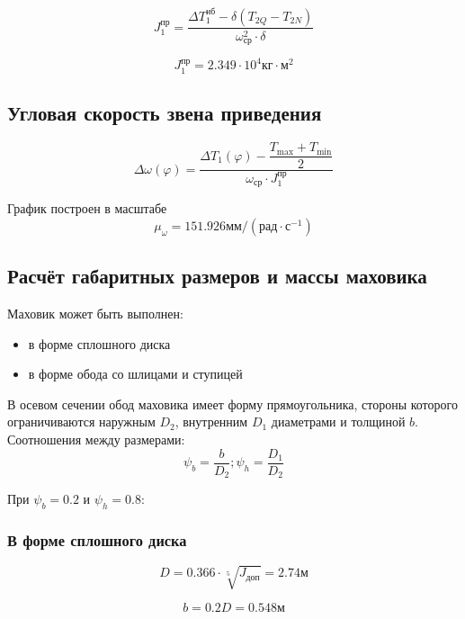 \begin{equation}
	J_1^{пр} = \dfrac{\Delta T_1^{нб} - \delta(T_{2Q} - T_{2N})}{\omega_{ср}^2 \cdot \delta}
\end{equation}

\begin{equation*}
	J_1^{пр} = 2.349 \cdot 10^4 кг \cdot м^2
\end{equation*}

\subsection{Угловая скорость звена приведения}

\begin{equation}
	\Delta \omega(\varphi) = \dfrac{\Delta T_1(\varphi) - \dfrac{T_{\max} + T_{\min}}{2}}{\omega_{ср} \cdot J_1^{пр}}
\end{equation}

График построен в масштабе $$ \mu_{\omega} = 151.926 мм/(рад \cdot с^{-1}) $$

\subsection{Расчёт габаритных размеров и массы маховика}

Маховик может быть выполнен:

\begin{itemize}
	\item в форме сплошного диска
	\item в форме обода со шлицами и ступицей
\end{itemize}

В осевом сечении обод маховика имеет форму прямоугольника, стороны которого ограничиваются наружным $D_2$, внутренним $ D_1 $ диаметрами и толщиной $b$. Соотношения между размерами: $$ \psi_b = \dfrac{b}{D_2}; \psi_h = \dfrac{D_1}{D_2}$$

При $ \psi_b = 0.2 $ и $ \psi_h = 0.8$:

\subsubsection{В форме сплошного диска}

\begin{equation}
	D = 0.366 \cdot \sqrt[5]{J_{доп}} = 2.74 м
\end{equation}

\begin{equation}
	b = 0.2D = 0.548 м
\end{equation}

